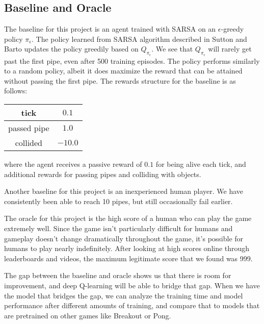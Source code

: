 \documentclass{article}
\begin{document}
\subsection{Baseline and Oracle}
The baseline for this project is an agent trained with SARSA on an $\epsilon$-greedy policy $\pi_{\epsilon}$.
The policy learned from SARSA algorithm described in Sutton and Barto updates the policy greedily based on $Q_{\pi_{\epsilon}}$. \cite{rl}
We see that $Q_{\pi_{\epsilon}}$ will rarely get past the first pipe, even after 500 training episodes.
The policy performs similarly to a random policy, albeit it does maximize the reward that can be attained without passing the first pipe.
The rewards structure for the baseline is as follows:
\begin{center}
\begin{tabular} { | c | c | }
    \hline
    tick & $0.1$ \\
    \hline
    passed pipe & $1.0$ \\
    \hline
    collided & $-10.0$ \\
    \hline
\end{tabular}
\end{center}
where the agent receives a passive reward of $0.1$ for being alive each tick, and additional rewards for passing pipes and colliding with objects.

Another baseline for this project is an inexperienced human player. 
We have consistently been able to reach 10 pipes, but still occasionally fail earlier.

The oracle for this project is the high score of a human who can play the game extremely well.
Since the game isn't particularly difficult for humans and gameplay doesn't change dramatically throughout the game, it's possible for humans to play nearly indefinitely.
After looking at high scores online through leaderboards and videos, the maximum legitimate score that we found was 999. 

The gap between the baseline and oracle shows us that there is room for improvement, and deep Q-learning will be able to bridge that gap.
When we have the model that bridges the gap, we can analyze the training time and model performance after different amounts of training, and compare that to models that are pretrained on other games like Breakout or Pong.




\end{document}
